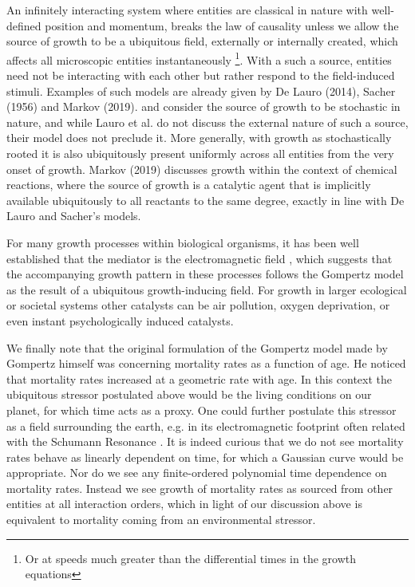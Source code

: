 \documentclass{article}
\begin{document}
An infinitely interacting system where entities are classical in nature with well-defined position and momentum, breaks the law of causality unless we allow the source of growth to be a ubiquitous field, externally or internally created, which affects all microscopic entities instantaneously \footnote{Or at speeds much greater than the differential times in the growth equations}. With a such a source, entities need not be interacting with each other but rather respond to the field-induced stimuli. Examples of such models are already given by De Lauro (2014), Sacher (1956) and Markov (2019). \citet{de2014stochastic} and \citet{sacher1956statistical} consider the source of growth to be stochastic in nature, and while Lauro et al. do not discuss the external nature of such a source, their model does not preclude it. More generally, with growth as stochastically rooted it is also ubiquitously present uniformly across all entities from the very onset of growth. Markov (2019)\cite{markov2019reaction} discusses growth within the context of chemical reactions, where the source of growth is a catalytic agent that is implicitly available ubiquitously to all reactants to the same degree, exactly in line with De Lauro and Sacher's models. 

For many growth processes within biological organisms, it has been well established that the mediator is the electromagnetic field \cite{becker1984electromagnetic}, which suggests that the accompanying growth pattern in these processes follows the Gompertz model as the result of a ubiquitous growth-inducing field. For growth in larger ecological or societal systems other catalysts can be air pollution, oxygen deprivation, or even instant psychologically induced catalysts. 

We finally note that the original formulation of the Gompertz model made by Gompertz himself was concerning mortality rates as a function of age. He noticed that mortality rates increased at a geometric rate with age. In this context the ubiquitous stressor postulated above would be the living conditions on our planet, for which time acts as a proxy. One could further postulate this stressor as a field surrounding the earth, e.g. in its electromagnetic footprint often related with the Schumann Resonance \cite{cherry2002schumann,schumann1952strahlungslosen}. It is indeed curious that we do not see mortality rates behave as linearly dependent on time, for which a Gaussian curve would be appropriate. Nor do we see any finite-ordered polynomial time dependence on mortality rates. Instead we see growth of mortality rates as sourced from other entities at all interaction orders, which in light of our discussion above is equivalent to mortality coming from an environmental stressor.
\end{document}

